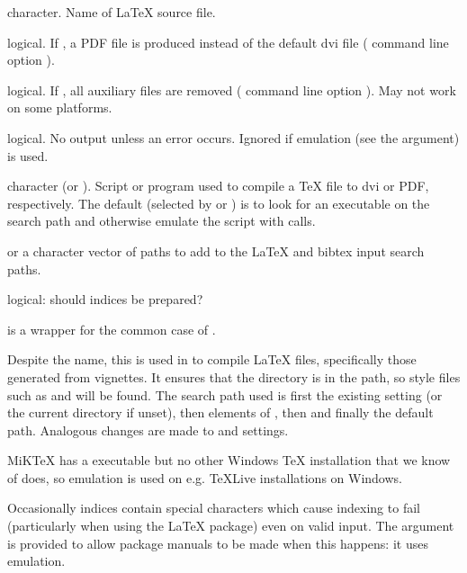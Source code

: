 \begin{Arguments}
\begin{ldescription}
\item[\code{file}] character.  Name of LaTeX source file.
\item[\code{pdf}] logical.  If , a PDF file is produced instead of
the default dvi file ( command line option ).
\item[\code{clean}] logical.  If , all auxiliary files are removed
( command line option ).  May not work on
some platforms.
\item[\code{quiet}] logical.  No output unless an error occurs.  Ignored if
emulation (see the  argument) is used.
\item[\code{texi2dvi}] character (or ).  Script or program used to
compile a TeX file to dvi or PDF, respectively.
The default (selected by  or ) is to look for an
executable on the search path and otherwise emulate the script with
 calls.
\item[\code{texinputs}]  or a character vector of paths to add to
the LaTeX and bibtex input search paths.
\item[\code{index}] logical: should indices be prepared?
\end{ldescription}
\end{Arguments}
%
\begin{Details}\relax
{} is a wrapper for the common case of
.

Despite the name, this is used in \R{} to compile LaTeX files,
specifically those generated from vignettes.  It
ensures that the  directory is
in the  path, so \R{} style files such as 
and  will be found.  The search path used is first the
existing  setting (or the current directory if unset),
then elements of , then
 and finally the default
path.  Analogous changes are made to  and
 settings.

MiKTeX has a  executable but no other Windows TeX
installation that we know of does, so emulation is used on e.g. TeXLive
installations on Windows.

Occasionally indices contain special characters which cause indexing
to fail (particularly when using the  LaTeX package)
even on valid input.  The argument  is provided to
allow package manuals to be made when this happens: it uses emulation.
\end{Details}
